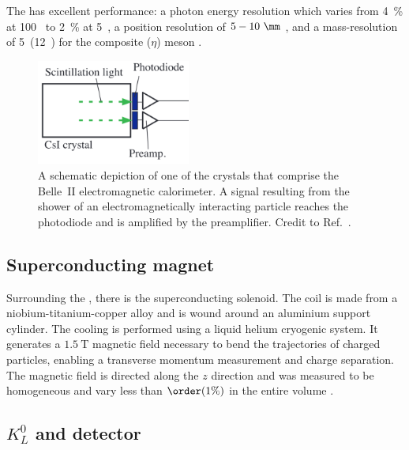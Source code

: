 The \ECL has excellent performance: a photon energy resolution which varies from 4~\% at 100~\mev \cite{Miyabayashi:2020xzp} to 2~\% at 5~\gev \cite{Aulchenko:2015nvy},
a position resolution of $5-10~\mm$ \cite{Miyabayashi:2020xzp}, and a mass-resolution of 5~\mevcc(12~\mevcc) for the composite \piz ($\eta$) meson \cite{Miyabayashi:2020xzp}.

\begin{figure}[htbp!]
    \centering
    \includegraphics[width=0.45\textwidth]{figures/experimental_setup/ecl.png}
    \caption{\label{fig:ecl}
    A schematic depiction of one of the crystals that comprise the Belle~II electromagnetic calorimeter.
    A signal resulting from the shower of an electromagnetically interacting particle reaches the photodiode and is amplified by the preamplifier.
    Credit to Ref.~\cite{Miyabayashi:2020xzp}.
    }
\end{figure}

\subsection{Superconducting magnet}\label{sec:magnet}

Surrounding the \ECL \cite{Belle-II:2010dht}, there is the superconducting solenoid.
The coil is made from a niobium-titanium-copper alloy and is wound around an aluminium support cylinder.
The cooling is performed using a liquid helium cryogenic system.
It generates a $1.5~\mathrm{T}$ magnetic field necessary 
to bend the trajectories of charged particles, 
enabling a transverse momentum measurement and charge separation.
The magnetic field is directed along the $z$ direction 
and was measured to be homogeneous and vary less than $\order(1\%)$ in the entire volume \cite{BelleIITrackingGroup:2020hpx}.

\subsection{\texorpdfstring{$K_L^0$}{KL} and \texorpdfstring{\mu}{mu} detector}\label{sec:klm}

